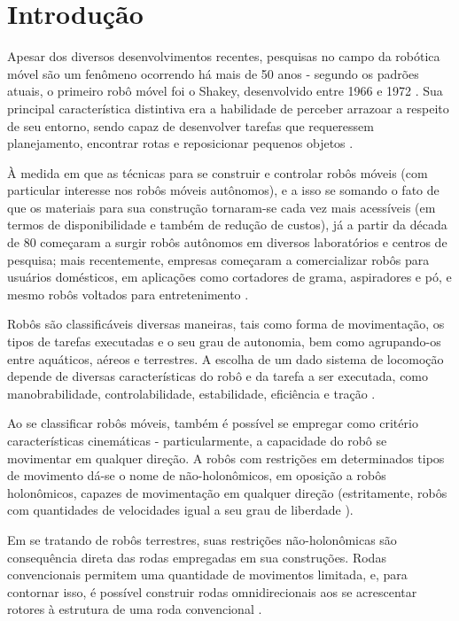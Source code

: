 \chapter{Introdução}

Apesar dos diversos desenvolvimentos recentes, pesquisas no campo da robótica móvel são um fenômeno ocorrendo há mais de 50 anos - segundo os padrões atuais, 
o primeiro robô móvel foi o Shakey, desenvolvido entre 1966 e 1972 \cite{TAKAHASHI}. 
Sua principal característica distintiva era a habilidade de perceber arrazoar a respeito de seu entorno, 
sendo capaz de desenvolver tarefas que requeressem planejamento, encontrar rotas e reposicionar pequenos objetos \cite{sri_international}.

À medida em que as técnicas para se construir e controlar robôs móveis (com particular interesse nos robôs móveis autônomos), 
e a isso se somando o fato de que os materiais para sua construção tornaram-se cada vez mais acessíveis (em termos de disponibilidade 
e também de redução de custos), já a partir da década de 80 começaram a surgir robôs autônomos em diversos laboratórios e centros de pesquisa;
 mais recentemente, empresas começaram a comercializar robôs para usuários domésticos, em aplicações como cortadores de grama, aspiradores e pó, 
 e mesmo robôs voltados para entretenimento \cite{TAKAHASHI}.

Robôs são classificáveis diversas maneiras, tais como forma de movimentação, os tipos de tarefas executadas e o seu grau de autonomia, 
bem como agrupando-os entre aquáticos, aéreos e terrestres. A escolha de um dado sistema de locomoção depende de diversas características do robô e 
da tarefa a ser executada, como manobrabilidade, controlabilidade, estabilidade, eficiência e tração \cite{TAKAHASHI}.

Ao se classificar robôs móveis, também é possível se empregar como critério características cinemáticas - particularmente, 
a capacidade do robô se movimentar em qualquer direção. A robôs com restrições em determinados tipos de movimento dá-se o nome de não-holonômicos, 
em oposição a robôs holonômicos, capazes de movimentação em qualquer direção (estritamente, robôs com quantidades de velocidades igual a seu grau de liberdade \cite{TAKAHASHI}).

Em se tratando de robôs terrestres, suas restrições não-holonômicas são consequência direta das rodas empregadas em sua construções. 
Rodas convencionais permitem uma quantidade de movimentos limitada, e, para contornar isso, é possível construir rodas omnidirecionais aos se acrescentar rotores à estrutura de uma roda convencional \cite{TAKAHASHI}.

